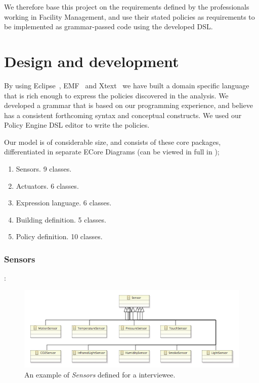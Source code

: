 \documentclass{llncs}
\begin{document}
We therefore base this project on the requirements defined by the professionals working in Facility Management, and use their stated policies as requirements to be implemented as grammar-passed code using the developed DSL.

\section{Design and development}\label{sec:dsldesign}
By using Eclipse~\cite{eclipse}, EMF~\cite{emf} and Xtext~\cite{xtext} we have built a domain specific language that is rich enough to express the policies discovered in the analysis. We developed a grammar that is based on our programming experience, and believe has a consistent forthcoming syntax and conceptual constructs. We used our Policy Engine DSL editor to write the policies.

Our model is of considerable size, and consists of these core packages, differentiated in separate ECore Diagrams (can be viewed in full in );

\begin{enumerate}
	\item Sensors. 9 classes.
	\item Actuators. 6 classes.
	\item Expression language. 6 classes.
	\item Building definition. 5 classes.
	\item Policy definition. 10 classes.
\end{enumerate}

\subsubsection{Sensors}:
\begin{figure}
	\centering
    \includegraphics[scale=0.7]{ecore-sensors.png} 
	\caption{An example of \textit{Sensors} defined for a interviewee.}
	\label{fig:ecore-sensors}
\end{figure}
\end{document}
